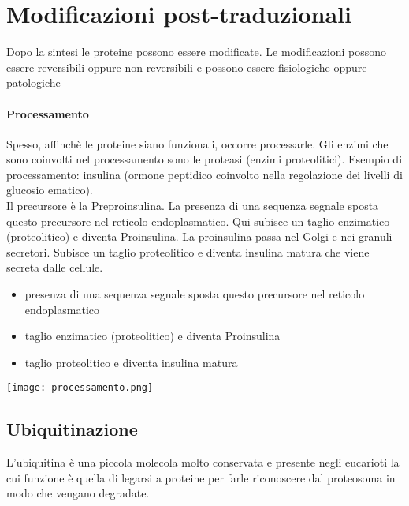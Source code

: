 \documentclass{article}
\begin{document}
\section{Modificazioni post-traduzionali}
Dopo la sintesi le proteine possono essere modificate. Le modificazioni possono essere reversibili oppure non reversibili e possono essere fisiologiche oppure patologiche
\paragraph{Processamento}
Spesso, affinchè le proteine siano funzionali, occorre processarle. Gli enzimi che sono coinvolti nel processamento
sono le proteasi (enzimi proteolitici). Esempio di processamento: insulina (ormone peptidico coinvolto nella regolazione dei livelli di glucosio ematico).\\
Il precursore è la Preproinsulina. La presenza di una sequenza segnale sposta questo precursore nel reticolo endoplasmatico. Qui subisce un taglio enzimatico
(proteolitico) e diventa Proinsulina. La proinsulina passa nel Golgi e nei granuli secretori. Subisce un taglio proteolitico e diventa insulina matura che viene secreta
dalle cellule.
\begin{itemize}
    \item presenza di una sequenza segnale sposta questo precursore nel reticolo endoplasmatico
    \item taglio enzimatico (proteolitico) e diventa Proinsulina
    \item taglio proteolitico e diventa insulina matura
\end{itemize}
\begin{center}
    \texttt{[image: processamento.png]}
\end{center}
\subsection{Ubiquitinazione}
L'ubiquitina è una piccola molecola molto conservata e presente negli eucarioti la cui funzione è quella di
legarsi a proteine per farle riconoscere dal proteosoma in modo che vengano degradate.
\end{document}
